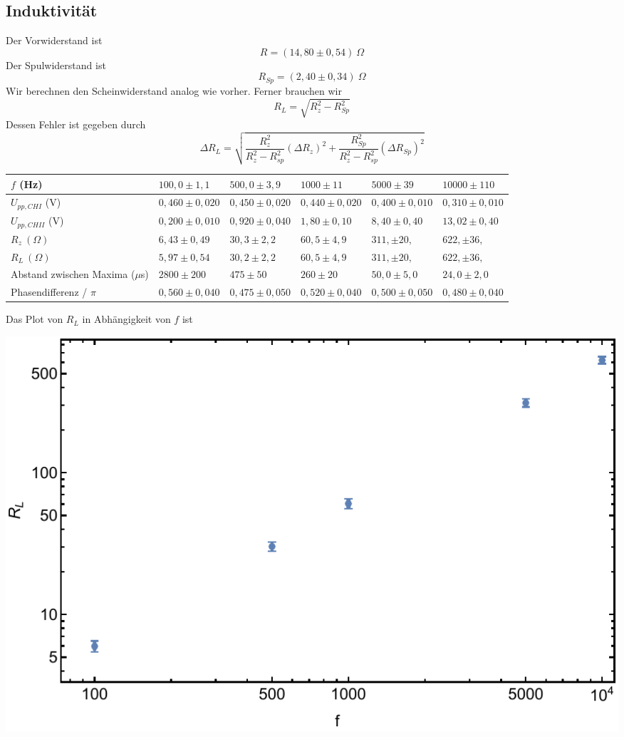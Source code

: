 \documentclass[prb,12pt]{revtex4-2}
\theoremstyle{definition}
\theoremstyle{definition}
\begin{document}
\subsection{Induktivität}
Der Vorwiderstand ist
\[R=(14,80\pm 0,54)~\Omega\]
Der Spulwiderstand ist
\[R_{Sp}=(2,40\pm 0,34)~\Omega\]
Wir berechnen den Scheinwiderstand analog wie vorher. Ferner brauchen wir
\[R_L=\sqrt{R_z^2 - R_{Sp}^2}\]
Dessen Fehler ist gegeben durch
\[\Delta R_L=\sqrt{\frac{R_z^2}{R_z^2 - R_{sp}^2}(\Delta R_z)^2+\frac{R_{Sp}^2}{R_z^2 - R_{sp}^2}(\Delta R_{Sp})^2}\]
\begin{center}
	\begin{tabularx}{\textwidth}{XXXXXX}
	\toprule
	$f$ (Hz) & $100,0\pm 1,1$ & $500,0\pm 3,9$ & $1000\pm 11$ & $5000\pm 39$ & $10000\pm 110$\\\midrule
	$U_{pp,CHI}$ (V) & $0,460\pm 0,020$ & $0,450\pm 0,020$ & $0,440\pm 0,020$ & $0,400\pm 0,010$ & $0,310\pm 0,010$ \\\midrule
	$U_{pp,CHII}$ (V) & $0,200\pm 0,010$ & $0,920\pm 0,040$ & $1,80\pm 0,10$ & $8,40\pm 0,40$ & $13,02\pm 0,40$\\\midrule
	$R_z~(\Omega)$ & $6,43\pm 0,49$ & $30,3\pm 2,2$ & $60,5\pm 4,9$ & $311,\pm 20,$ & $622,\pm 36,$\\\midrule
	$R_L~(\Omega)$ & $5,97\pm 0,54$ & $30,2\pm 2,2$ & $60,5\pm 4,9$ & $311,\pm 20,$ & $622,\pm 36,$\\\midrule
	Abstand zwischen Maxima ($\mu$s) & $2800\pm 200$ & $475\pm 50$ & $260\pm 20$ & $50,0\pm 5,0$ & $24,0\pm 2,0$\\\midrule
	Phasendifferenz / $\pi$ & $0,560\pm 0,040$ & $0,475\pm 0,050$ & $0,520\pm 0,040$ & $0,500\pm 0,050$ & $0,480\pm 0,040$\\\bottomrule
\end{tabularx}
\end{center}
Das Plot von $R_L$ in Abhängigkeit von $f$ ist
\begin{center}
	\includegraphics[width=	\textwidth]{plt2.pdf}
\end{center}
\end{document}
